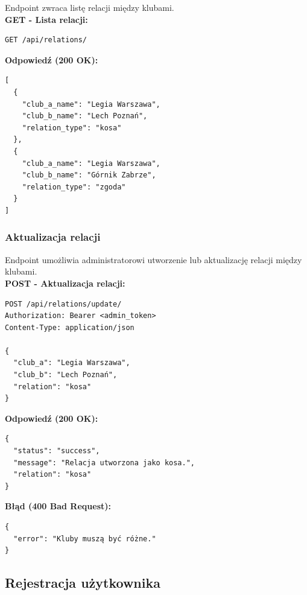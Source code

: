 \documentclass[a4paper,12pt]{article}
\begin{document}
Endpoint zwraca listę relacji między klubami. \\

\textbf{GET - Lista relacji:}
\begin{lstlisting}
GET /api/relations/
\end{lstlisting}

\textbf{Odpowiedź (200 OK):}
\begin{lstlisting}
[
  {
    "club_a_name": "Legia Warszawa",
    "club_b_name": "Lech Poznań",
    "relation_type": "kosa"
  },
  {
    "club_a_name": "Legia Warszawa",
    "club_b_name": "Górnik Zabrze",
    "relation_type": "zgoda"
  }
]
\end{lstlisting}

\newpage

\subsubsection{Aktualizacja relacji}

Endpoint umożliwia administratorowi utworzenie lub aktualizację relacji między klubami. \\

\textbf{POST - Aktualizacja relacji:}
\begin{lstlisting}
POST /api/relations/update/
Authorization: Bearer <admin_token>
Content-Type: application/json

{
  "club_a": "Legia Warszawa",
  "club_b": "Lech Poznań",
  "relation": "kosa"
}
\end{lstlisting}

\vspace{0.5cm}

\textbf{Odpowiedź (200 OK):}
\begin{lstlisting}
{
  "status": "success",
  "message": "Relacja utworzona jako kosa.",
  "relation": "kosa"
}
\end{lstlisting}

\vspace{0.5cm}

\textbf{Błąd (400 Bad Request):}
\begin{lstlisting}
{
  "error": "Kluby muszą być różne."
}
\end{lstlisting}

\newpage

\subsection{Rejestracja użytkownika}
\end{document}
